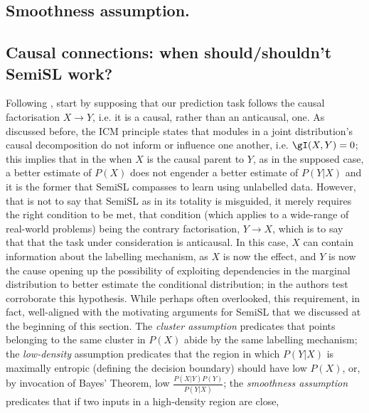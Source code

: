 \subsection{Smoothness assumption.}\label{ssec:smoothness_assumption}
\subsection{
  Causal connections: when should/shouldn't SemiSL work?
}\label{ssec:smoothness_assumption}

Following \cite{scholkopf2021toward}, start by supposing that our prediction task follows the
causal factorisation \( X \to Y\), i.e. it is a causal, rather than an anticausal, one.
%
As discussed before, the ICM principle states that modules in a joint distribution's causal
decomposition do not inform or influence one another, i.e. \(\gI(X, Y) = 0 \); this implies that in
the when \(X\) is the causal parent to \(Y\), as in the supposed case, a better estimate of
\(P(X)\) does not engender a better estimate of \(P(Y|X)\) and it is the former that SemiSL
compasses to learn using unlabelled data.
%
However, that is not to say that SemiSL as in its totality is misguided, it merely requires the
right condition to be met, that condition (which applies to a wide-range of real-world problems)
being the contrary factorisation, \(Y \to X \), which is to say that that the task under
consideration is anticausal.
%
In this case, \(X\) can contain information about the labelling mechanism, as \(X\) is now the
effect, and \(Y\) is now the cause opening up the possibility of exploiting dependencies in the
marginal distribution to better estimate the conditional distribution; in
\cite{scholkopf2012causal} the authors test corroborate this hypothesis.
%
While perhaps often overlooked, this requirement, in fact, well-aligned with the motivating
arguments for SemiSL that we discussed at the beginning of this section.
%
The \emph{cluster assumption} predicates that points belonging to the same cluster in \(P(X)\)
abide by the same labelling mechanism; 
%
the \emph{low-density} assumption predicates that the region in which \(P(Y|X)\) is maximally
entropic (defining the decision boundary) should have low \(P(X)\), or, by invocation of Bayes'
Theorem, low \( \frac{ P(X|Y)P(Y) }{ P(Y|X) } \); 
%
the \emph{smoothness assumption} predicates that if two inputs in a high-density region are close,
